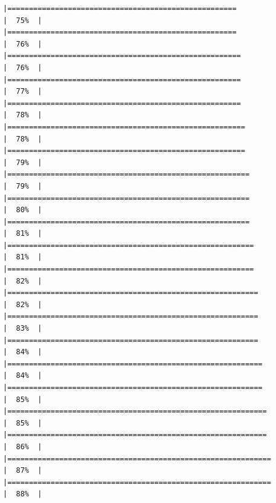 \documentclass[
]{article}
\begin{document}
\begin{verbatim}
|=====================================================                 |  75%  |                                                                              |=====================================================                 |  76%  |                                                                              |======================================================                |  76%  |                                                                              |======================================================                |  77%  |                                                                              |======================================================                |  78%  |                                                                              |=======================================================               |  78%  |                                                                              |=======================================================               |  79%  |                                                                              |========================================================              |  79%  |                                                                              |========================================================              |  80%  |                                                                              |========================================================              |  81%  |                                                                              |=========================================================             |  81%  |                                                                              |=========================================================             |  82%  |                                                                              |==========================================================            |  82%  |                                                                              |==========================================================            |  83%  |                                                                              |==========================================================            |  84%  |                                                                              |===========================================================           |  84%  |                                                                              |===========================================================           |  85%  |                                                                              |============================================================          |  85%  |                                                                              |============================================================          |  86%  |                                                                              |=============================================================         |  87%  |                                                                              |=============================================================         |  88%  |                                                                              
\end{verbatim}
\end{document}
